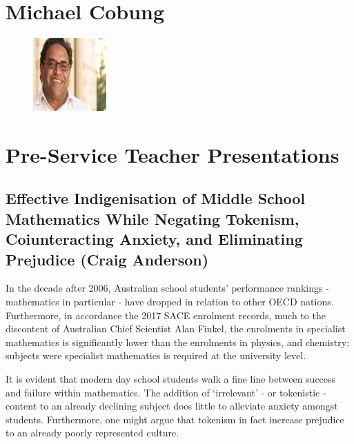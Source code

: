 \documentclass[twoside,14pt,a4paper,notitlepage]{memoir}
\begin{document}
\lipsum[1]

\section*{Michael Cobung}

\begin{figure}
\centering
\includegraphics[width=0.25\textwidth]{michael_colbung.jpeg}
\end{figure}
\lipsum[2]
\vfill

\pagebreak
\section*{Pre-Service Teacher Presentations}




\subsection*{Effective Indigenisation of Middle School Mathematics While Negating Tokenism, Coiunteracting Anxiety, and Eliminating Prejudice (Craig Anderson)}
\label{aut:anderson}

In the decade after 2006, Australian school students’ performance rankings - mathematics in particular - have dropped in relation to other OECD nations. Furthermore, in accordance the 2017 SACE enrolment records, much to the discontent of Australian Chief Scientist Alan Finkel, the enrolments in specialist mathematics is significantly lower than the enrolments in physics, and chemistry; subjects were specialist mathematics is required at the university level.
 
It is evident that modern day school students walk a fine line between success and failure within mathematics. The addition of ‘irrelevant’ - or tokenistic - content to an already declining subject does little to alleviate anxiety amongst students. Furthermore, one might argue that tokenism in fact increase prejudice to an already poorly represented culture.
 
\end{document}
